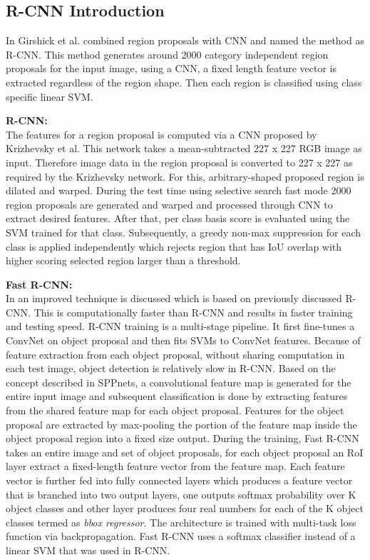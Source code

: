 \subsection{R-CNN Introduction}
In \cite{girshick2014rich} Girshick et al. combined region proposals with CNN and named the method as R-CNN. This method generates around 2000 category independent region proposals for the input image, using a CNN, a fixed length feature vector is extracted regardless of the region shape. Then each region is classified using class specific linear SVM. 

\newpara \textbf{R-CNN:} \\
The features for a region proposal \cite{girshick2014rich, girshick2015fast, ren2015faster} is computed via a CNN proposed by Krizhevsky et al. This network takes a mean-subtracted 227 x 227 RGB image as input. Therefore image data in the region proposal is converted to 227 x 227 as required by the Krizhevsky network. For this, arbitrary-shaped  proposed region is dilated and warped. During the test time using selective search fast mode 2000 region proposals are generated and warped and processed through CNN to extract desired features. After that, per class basis score is evaluated using the SVM trained for that class. Subsequently, a greedy non-max suppression for each class is applied independently which rejects region that has IoU overlap with higher scoring selected region larger than a threshold.

\newpara \textbf{Fast R-CNN:} \\
In \cite{girshick2015fast} an improved technique is discussed which is based on previously discussed R-CNN. This is computationally faster than R-CNN and results in faster training and testing speed. R-CNN training is a multi-stage pipeline. It first fine-tunes a ConvNet on object proposal and then fits SVMs to ConvNet features. Because of feature extraction from each object proposal, without sharing computation in each test image, object detection is relatively slow in R-CNN. Based on the concept described in SPPnets, a convolutional feature map is generated for the entire input image and subsequent classification is done by extracting features from the shared feature map for each object proposal. Features for the object proposal are extracted by max-pooling the portion of the feature map inside the  object proposal region into a fixed size output. During the training, Fast R-CNN takes an entire image and set of object proposals, for each object proposal an RoI layer extract a fixed-length feature vector from the feature map. Each feature vector is further fed into fully connected layers which produces a feature vector that is branched into two output layers, one outputs softmax probability over K object classes and other layer produces four real numbers for each of the K object classes termed as \textit{bbox regressor}. The architecture is trained with multi-task loss function via backpropagation. Fast R-CNN uses a softmax classifier instead of a linear SVM that was used in R-CNN.


